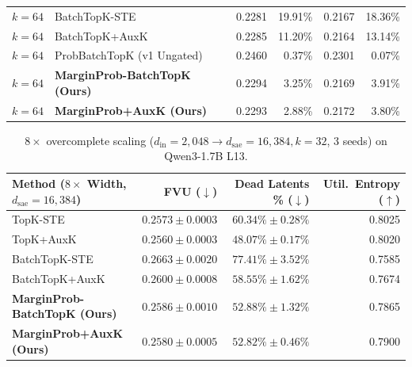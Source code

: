 \documentclass[10pt]{article}
\begin{document}
\begin{table}[t]
{\begin{tabular}{llrrrr}
    $k=64$ & BatchTopK-STE \citep{bussmann2024batchtopk} & 0.2281 & 19.91\% & 0.2167 & 18.36\% \\
    $k=64$ & BatchTopK+AuxK \citep{bussmann2024batchtopk} & 0.2285 & 11.20\% & 0.2164 & 13.14\% \\
    $k=64$ & ProbBatchTopK (v1 Ungated) & 0.2460 & 0.37\% & 0.2301 & 0.07\% \\
    $k=64$ & \textbf{MarginProb-BatchTopK (Ours)} & 0.2294 & 3.25\% & 0.2169 & 3.91\% \\
    $k=64$ & \textbf{MarginProb+AuxK (Ours)} & 0.2293 & 2.88\% & 0.2172 & 3.80\% \\
    \bottomrule
  \end{tabular}}
\end{table}

\begin{table}[t]
  \centering
  \caption{$8\times$ overcomplete scaling ($d_{\mathrm{in}}=2{,}048 \to d_{\mathrm{sae}}=16{,}384, k=32$, 3 seeds) on Qwen3-1.7B L13.}
  \label{tab:sae_8x}
  \scriptsize
  \begin{tabular}{lrrr}
    \toprule
    Method ($8\times$ Width, $d_{\mathrm{sae}}=16{,}384$) & FVU ($\downarrow$) & Dead Latents \% ($\downarrow$) & Util.\ Entropy ($\uparrow$) \\
    \midrule
        TopK-STE \citep{gao2024scaling} & $0.2573\pm0.0003$ & $60.34\%\pm0.28\%$ & 0.8025 \\
    TopK+AuxK \citep{gao2024scaling} & $0.2560\pm0.0003$ & $48.07\%\pm0.17\%$ & 0.8020 \\
    BatchTopK-STE \citep{bussmann2024batchtopk} & $0.2663\pm0.0020$ & $77.41\%\pm3.52\%$ & 0.7585 \\
    BatchTopK+AuxK \citep{bussmann2024batchtopk} & $0.2600\pm0.0008$ & $58.55\%\pm1.62\%$ & 0.7674 \\
    \textbf{MarginProb-BatchTopK (Ours)} & $0.2586\pm0.0010$ & $52.88\%\pm1.32\%$ & 0.7865 \\
    \textbf{MarginProb+AuxK (Ours)} & $0.2580\pm0.0005$ & $52.82\%\pm0.46\%$ & 0.7900 \\
    \bottomrule
  \end{tabular}
\end{table}
\end{document}
